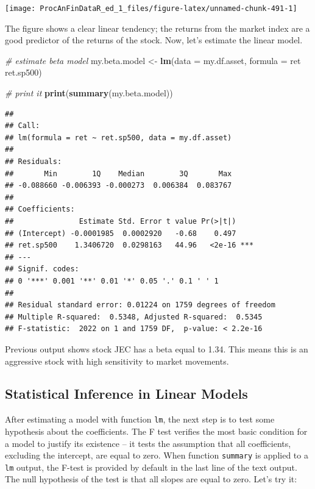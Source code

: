 \documentclass[11pt,]{book}
\newenvironment{Shaded}{\begin{snugshade}}{\end{snugshade}}
\newcommand{\KeywordTok}[1]{\textcolor[rgb]{0.27,0.27,0.27}{\textbf{#1}}}
\newcommand{\DataTypeTok}[1]{\textcolor[rgb]{0.27,0.27,0.27}{#1}}
\newcommand{\StringTok}[1]{\textcolor[rgb]{0.5,0.5,0.5}{#1}}
\newcommand{\CommentTok}[1]{\textcolor[rgb]{0.56,0.35,0.01}{\textit{#1}}}
\newcommand{\OperatorTok}[1]{\textcolor[rgb]{0.81,0.36,0.00}{\textbf{#1}}}
\newcommand{\NormalTok}[1]{#1}
\begin{document}
\begin{center}\texttt{[image: ProcAnFinDataR\_ed\_1\_files/figure-latex/unnamed-chunk-491-1]} \end{center}

The figure shows a clear linear tendency; the returns from the market
index are a good predictor of the returns of the stock. Now, let's
estimate the linear model.

\begin{Shaded}
\begin{Highlighting}[]
\CommentTok{# estimate beta model}
\NormalTok{my.beta.model <-}\StringTok{ }\KeywordTok{lm}\NormalTok{(}\DataTypeTok{data =}\NormalTok{ my.df.asset, }\DataTypeTok{formula =}\NormalTok{ ret }\OperatorTok{~}\StringTok{ }\NormalTok{ret.sp500)}

\CommentTok{# print it}
\KeywordTok{print}\NormalTok{(}\KeywordTok{summary}\NormalTok{(my.beta.model))}
\end{Highlighting}
\end{Shaded}

\begin{verbatim}
## 
## Call:
## lm(formula = ret ~ ret.sp500, data = my.df.asset)
## 
## Residuals:
##       Min        1Q    Median        3Q       Max 
## -0.088660 -0.006393 -0.000273  0.006384  0.083767 
## 
## Coefficients:
##               Estimate Std. Error t value Pr(>|t|)    
## (Intercept) -0.0001985  0.0002920   -0.68    0.497    
## ret.sp500    1.3406720  0.0298163   44.96   <2e-16 ***
## ---
## Signif. codes:  
## 0 '***' 0.001 '**' 0.01 '*' 0.05 '.' 0.1 ' ' 1
## 
## Residual standard error: 0.01224 on 1759 degrees of freedom
## Multiple R-squared:  0.5348, Adjusted R-squared:  0.5345 
## F-statistic:  2022 on 1 and 1759 DF,  p-value: < 2.2e-16
\end{verbatim}

Previous output shows stock JEC has a beta equal to 1.34. This means
this is an aggressive stock with high sensitivity to market movements.

\subsection{Statistical Inference in Linear Models}\label{testing-ols}

After estimating a model with function \texttt{lm}, the next step is to
test some hypothesis about the coefficients. The F test verifies the
most basic condition for a model to justify its existence -- it tests
the assumption that all coefficients, excluding the intercept, are equal
to zero. When function \texttt{summary} is applied to a \texttt{lm}
output, the F-test is provided by default in the last line of the text
output. The null hypothesis of the test is that all slopes are equal to
zero. Let's try it:
\end{document}
